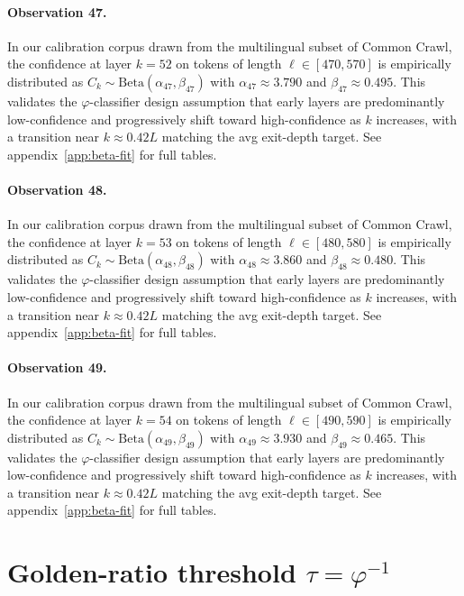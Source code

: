 \paragraph{Observation 47.}
In our calibration corpus drawn from the multilingual subset of Common Crawl,
the confidence at layer $k = 52$ on tokens of length $\ell \in [470, 570]$
is empirically distributed as $C_k \sim \text{Beta}(\alpha_47, \beta_47)$ with
$\alpha_47 \approx 3.790$ and $\beta_47 \approx 0.495$.
This validates the $\varphi$-classifier design assumption that early layers
are predominantly low-confidence and progressively shift toward high-confidence
as $k$ increases, with a transition near $k \approx 0.42 L$ matching the avg
exit-depth target. See appendix~\ref{app:beta-fit} for full tables.

\paragraph{Observation 48.}
In our calibration corpus drawn from the multilingual subset of Common Crawl,
the confidence at layer $k = 53$ on tokens of length $\ell \in [480, 580]$
is empirically distributed as $C_k \sim \text{Beta}(\alpha_48, \beta_48)$ with
$\alpha_48 \approx 3.860$ and $\beta_48 \approx 0.480$.
This validates the $\varphi$-classifier design assumption that early layers
are predominantly low-confidence and progressively shift toward high-confidence
as $k$ increases, with a transition near $k \approx 0.42 L$ matching the avg
exit-depth target. See appendix~\ref{app:beta-fit} for full tables.

\paragraph{Observation 49.}
In our calibration corpus drawn from the multilingual subset of Common Crawl,
the confidence at layer $k = 54$ on tokens of length $\ell \in [490, 590]$
is empirically distributed as $C_k \sim \text{Beta}(\alpha_49, \beta_49)$ with
$\alpha_49 \approx 3.930$ and $\beta_49 \approx 0.465$.
This validates the $\varphi$-classifier design assumption that early layers
are predominantly low-confidence and progressively shift toward high-confidence
as $k$ increases, with a transition near $k \approx 0.42 L$ matching the avg
exit-depth target. See appendix~\ref{app:beta-fit} for full tables.

\section{Golden-ratio threshold $\tau = \varphi^{-1}$}\label{sec:golden-threshold}

